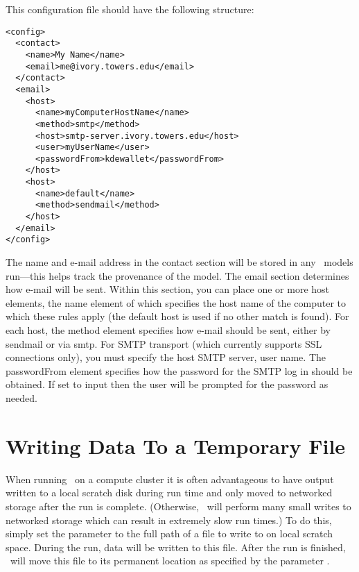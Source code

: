 This configuration file should have the following structure:
\begin{verbatim}
<config>
  <contact>
    <name>My Name</name>
    <email>me@ivory.towers.edu</email>
  </contact>
  <email>
    <host>
      <name>myComputerHostName</name>
      <method>smtp</method>
      <host>smtp-server.ivory.towers.edu</host>
      <user>myUserName</user>
      <passwordFrom>kdewallet</passwordFrom>
    </host>
    <host>
      <name>default</name>
      <method>sendmail</method>
    </host>
  </email>
</config>
\end{verbatim}
The name and e-mail address in the {\normalfont \ttfamily contact} section will be stored in any \glc\ models run---this helps track the provenance of the model. The {\normalfont \ttfamily email} section determines how e-mail will be sent. Within this section, you can place one or more {\normalfont \ttfamily host} elements, the {\normalfont \ttfamily name} element of which specifies the host name of the computer to which these rules apply (the {\normalfont \ttfamily default} host is used if no other match is found). For each host, the {\normalfont \ttfamily method} element specifies how e-mail should be sent, either by {\normalfont \ttfamily sendmail} or via {\normalfont \ttfamily smtp}. For SMTP transport (which currently supports SSL connections only), you must specify the {\normalfont \ttfamily host} SMTP server, {\normalfont \ttfamily user} name. The {\normalfont \ttfamily passwordFrom} element specifies how the password for the SMTP log in should be obtained. If set to {\normalfont \ttfamily input} then the user will be prompted for the password as needed.

\section{Writing Data To a Temporary File}

When running \glc\ on a compute cluster it is often advantageous to have output written to a local scratch disk during run time and only moved to networked storage after the run is complete. (Otherwise, \glc\ will perform many small writes to networked storage which can result in extremely slow run times.) To do this, simply set the parameter {\normalfont \ttfamily [galacticusOutputScratchFileName]} to the full path of a file to write to on local scratch space. During the run, data will be written to this file. After the run is finished, \glc\ will move this file to its permanent location as specified by the parameter {\normalfont \ttfamily [galacticusOutputFileName]}.

